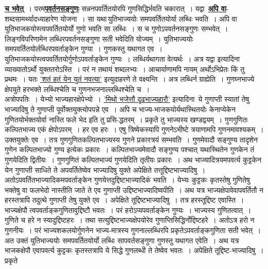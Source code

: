 \documentclass[11pt, openany]{book}
\begin{document}
\begin{sloppypar}
\noindent \hyperref[5.53]{\textbf{च भवेत्}}~। परम\hyperref[5.53]{\textbf{पवर्तनसङ्गुणः}} सन्ननपवर्तितयोरपि गुणसिद्धिर्भवति चकारात्~। यद्वा~\hyperref[5.53]{\textbf{अपि वा}}-शब्दसामर्थ्यादध्याहारेण योजना~। सा यथा\textendash \,युतिभाज्ययोः समपवर्तितयोर्या लब्धिः भवति~। अपि वा युतिभाजकयोस्त्वपवर्तितयोर्यो गुणो भवति सा लब्धिः~। स च गुणोऽपवर्तनसङ्गुणः सम्भवेत्~। लिङ्गविपरिणामेन लब्धिरपवर्तनसङ्गुणा सती भवेदिति योज्यम्~। युतिभाज्ययोः समपवर्तितयोर्लब्धिरपवर्ताङ्केन गुण्या~। गुणकस्तु यथागत एव~। युतिभाजकयोस्त्वपवर्तितयोर्गुणोऽपवर्ताङ्केन गुण्यः~। लब्धिर्यथागता वेत्यर्थः~। अत्र यद्वा इत्यादिना व्याख्यातोऽर्थो युक्ततरोऽस्ति~। परं न तथायं शब्दलभ्यः~। आचार्याणामपि नायम् अर्थोऽभिप्रेतः किं तु प्रथमः~। यतः \hyperref[5.61]{'शतं हतं येन युतं नवत्या'} इत्युदाहरणे ते वक्ष्यन्ति~। अत्र लब्धिर्न ग्राह्येति~। गुणघ्नभाज्ये क्षेपयुते हरभक्ते लब्धिश्चेति च गुणनभजनाल्लब्धिश्चेति च~।\\

अत्रोपपतिः~। येभ्यो भाज्यहारक्षेपेभ्यो~। \hyperref[5.51]{'मिथो भजेत्तौ दृढभाज्यहारौ'} इत्यादिना~ये गुणाप्ती स्यातां तेषु भाज्यादिषु ते गुणाप्ती पूर्वोक्तयुक्त्योपपन्ने एव~। अपि च भाज्य-भाजकयोर्यथास्थितयोः केनाप्येकेन गुणितयोर्भक्तयोर्वा नास्ति फले भेद इति तु प्रसि-द्धतरम्~। प्रकृते तु भाज्यस्य खण्डद्वयम्~। गुणगुणितः कल्पितभाज्य एकं क्षेपोऽपरम्~। हर एव हरः~। एषु त्रिष्वेकस्यापि गुणनेऽभीष्टे त्रयाणामपि गुणनमावश्यकम्~। उक्तयुक्तेः एव~। तत्र गुणगुणितकल्पितभाज्यस्य गुणने प्रकारत्रयं सम्भवति~। गुणमेवादौ सङ्गुण्य तादृशेन गुणेन कल्पितभाज्यो गुण्य इत्येकः प्रकारः~। कल्पितभाज्यमेवादौ सङ्गुण्य पश्चात् यथास्थितेन गुणकेन तं गुणयेदिति द्वितीयः~। गुणगुणितं कल्पितभाज्यं गुणयेदिति तृतीयः प्रकारः~। अथ भाज्यादित्रयमपवर्त्य कुट्टकेन येन गुणाप्ती साधिते ते अपवर्तितेष्वेव भाज्यादिषु युक्ते अपेक्षिते तत्तूद्दिष्टभाज्यादिषु~। अतोऽपवर्तितभाज्यादिकमपवर्ताङ्केन गुणयेत्तदुद्दिष्टभाज्यादिकं भवति~। येभ्यः कुट्टकः कृतस्तेषु गुणितेषु भक्तेषु वा फलभेदो नास्तीति जाते ते एव गुणाप्ती उद्दिष्टभाज्यादिष्वपीति~। अथ यत्र भाज्यक्षेपावेवापवर्तितौ न हरस्तत्रापि तदुत्थे गुणाप्ती तेषु युक्ते एव~। अपेक्षिते तूद्दिष्टभाज्यादिषु~। तत्र हरस्तूद्दिष्ट एवास्ति~। भाज्यक्षेपौ त्वपवर्ताङ्कगुणितावुद्दिष्टौ भवतः~। परं हरोऽप्यपवर्ताङ्केन गुण्यः~। भाज्यस्य गुणितत्वात्~। गुणिते च हरे न स्यादुद्दिष्टहरः~। तथा सत्युद्दिष्टभाज्यक्षेपयोरेव गुणाप्तिसिद्धिर्नोद्दिष्टहरे~। अतोऽत्र हरो न गुणनीयः~। परं भाज्यशकलयोर्गुणनेन भाज्य-मात्रस्य गुणनाल्लब्धिरपि प्रकृतेऽपवर्ताङ्कगुणिता सती भवेत्~। अत उक्तं युतिभाज्ययोः समपवर्तितयोर्यो लब्धिः सापवर्तसङ्गुणा गुणस्तु यथागत एवेति~। अथ यत्र भाजकक्षेपौ एवापवर्त्य कुट्टकः कृतस्तत्रापि ये सिद्धे गुणलब्धी ते तेष्वेव भवतः~। अपेक्षिते तूद्दिष्ट-भाज्यादिषु~। प्रकृते
\end{sloppypar}
\end{document}

